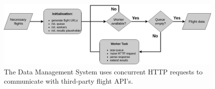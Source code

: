 


\begin{figure}[h]
  \centering
  \includegraphics[width=\textwidth]{./Figures/system_implementation/dms_factory.jpg}
  \caption{The Data Management System uses concurrent HTTP requests to communicate with third-party flight API's.}
  \label{fig:dms_implementation}  
\end{figure}







